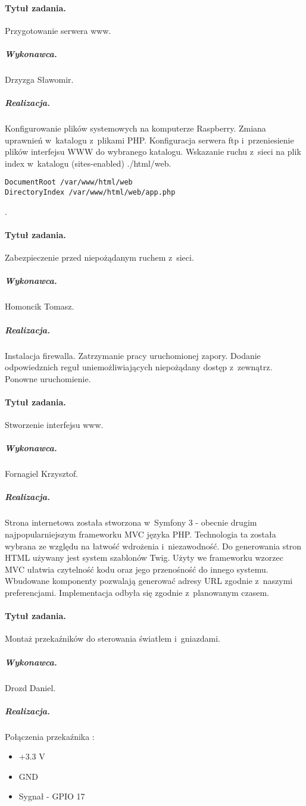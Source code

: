 	\paragraph{Tytuł zadania.} Przygotowanie serwera www.
\subparagraph{Wykonawca.} Drzyzga Sławomir.
\subparagraph{Realizacja.} 
Konfigurowanie plików systemowych na komputerze Raspberry. Zmiana uprawnień w~katalogu z~plikami PHP. Konfiguracja serwera ftp i~przeniesienie plików interfejsu WWW do wybranego katalogu. Wskazanie ruchu z~sieci na plik index w~katalogu (sites-enabled) ./html/web.
\begin{verbatim}
DocumentRoot /var/www/html/web
DirectoryIndex /var/www/html/web/app.php
\end{verbatim}.

	
	\paragraph{Tytuł zadania.} Zabezpieczenie przed niepożądanym ruchem z~sieci.
	\subparagraph{Wykonawca.} Homoncik Tomasz.
	\subparagraph{Realizacja.} Instalacja firewalla. Zatrzymanie pracy uruchomionej zapory. Dodanie odpowiedznich reguł uniemożliwiających niepożądany dostęp z~zewnątrz. Ponowne uruchomienie.
	
	\paragraph{Tytuł zadania.} Stworzenie interfejsu www.
	\subparagraph{Wykonawca.} Fornagiel Krzysztof.
	\subparagraph{Realizacja.} 
	Strona internetowa została stworzona w~Symfony 3 - obecnie drugim najpopularniejszym frameworku MVC języka PHP. Technologia ta została wybrana ze względu na łatwość wdrożenia i~niezawodność. Do generowania stron HTML używany jest system szablonów Twig. Użyty we frameworku wzorzec MVC ułatwia czytelność kodu oraz jego przenośność do innego systemu. Wbudowane komponenty pozwalają generować adresy URL zgodnie z~naszymi preferencjami. Implementacja odbyła się zgodnie z~planowanym czasem. 

	\paragraph{Tytuł zadania.} Montaż przekaźników do sterowania światłem i~gniazdami.
	\subparagraph{Wykonawca.} Drozd Daniel.
	\subparagraph{Realizacja.}   
	
 Połączenia przekaźnika : 
 \begin{itemize}
 	\item +3.3 V
 	\item GND
 	\item Sygnał - GPIO 17
 \end{itemize}
	
